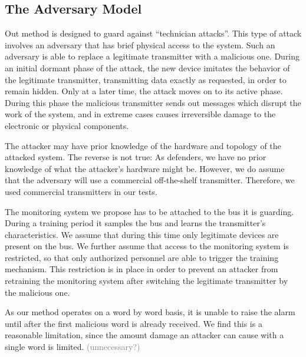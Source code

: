 \documentclass[conference]{IEEEtran}
\begin{document}
\subsection{The Adversary Model}
  Out method is designed to guard against ``technician attacks''. This type of attack involves an adversary that has brief physical access to the system. Such an adversary is able to replace a legitimate transmitter with a malicious one. During an initial dormant phase of the attack, the new device imitates the behavior of the legitimate transmitter, transmitting data exactly as requested, in order to remain hidden. Only at a later time, the attack moves on to its active phase. During this phase the malicious transmitter sends out messages which disrupt the work of the system, and in extreme cases causes irreversible damage to the electronic or physical components.
  

  The attacker may have prior knowledge of the hardware and topology of the attacked system. The reverse is not true: As defenders, we have no prior knowledge of what the attacker's hardware might be. However, we do assume that the adversary will use a commercial off-the-shelf transmitter. Therefore, we used commercial transmitters in our tests.

  The monitoring system we propose has to be attached to the bus it is guarding. During a training period it samples the bus and learns the transmitter's characteristics. We assume that during this time only legitimate devices are present on the bus. We further assume that access to the monitoring system is restricted, so that only authorized personnel are able to trigger the training mechanism. This restriction is in place in order to prevent an attacker from retraining the monitoring system after switching the legitimate transmitter by the malicious one. 
  
  As our method operates on a word by word basis, it is unable to raise the alarm until after the first malicious word is already received. We find this is a reasonable limitation, since the amount damage an attacker can cause with a single word is limited. \textcolor{gray}{(unnecessary?)}
\end{document}
